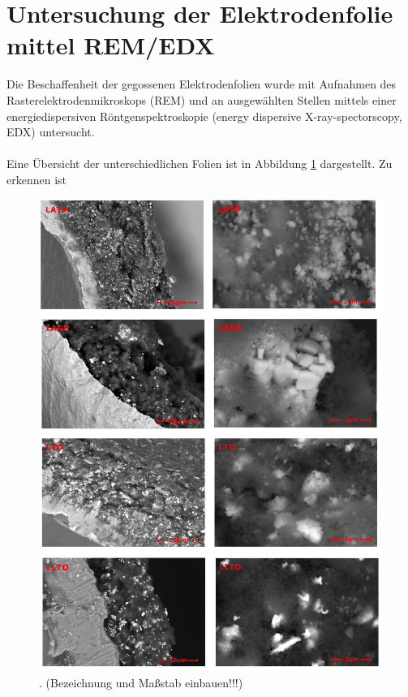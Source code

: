 \documentclass[a4paper, 11pt, headsepline,footsepline,twoside,abstract]{scrbook}
\begin{document}
\section{Untersuchung der Elektrodenfolie mittel REM/EDX}
Die Beschaffenheit der gegossenen Elektrodenfolien wurde mit Aufnahmen des Rasterelektrodenmikroskops (REM) und an ausgewählten Stellen mittels einer energiedispersiven Röntgenspektroskopie (energy dispersive X-ray-spectorscopy, EDX) untersucht.
\\\\
Eine Übersicht der unterschiedlichen Folien ist in Abbildung \ref{uebersicht_rem} dargestellt. Zu erkennen ist
\begin{figure}
	\centering
	\includegraphics[width=1.0\columnwidth]{images/Uebersicht_REM.jpg}
	\caption{. (Bezeichnung und Maßstab einbauen!!!)}
	\label{uebersicht_rem}
\end{figure}
\newpage
\end{document}
